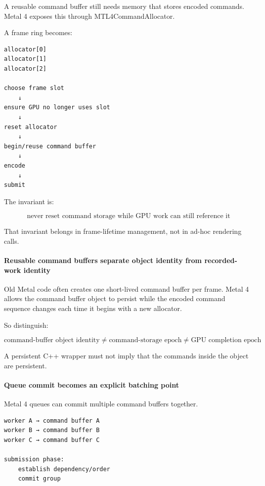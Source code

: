 A reusable command buffer still needs memory that stores encoded commands. Metal 4 exposes this through MTL4CommandAllocator.

A frame ring becomes:

\begin{verbatim}
allocator[0]
allocator[1]
allocator[2]

choose frame slot
    ↓
ensure GPU no longer uses slot
    ↓
reset allocator
    ↓
begin/reuse command buffer
    ↓
encode
    ↓
submit
\end{verbatim}

The invariant is:

\[
\boxed{
\text{never reset command storage while GPU work can still reference it}
}
\]

That invariant belongs in frame-lifetime management, not in ad-hoc rendering calls.

\paragraph{Reusable command buffers separate object identity from recorded-work identity}\label{reusable-command-buffers-separate-object-identity-from-recorded-work-identity}

Old Metal code often creates one short-lived command buffer per frame. Metal 4 allows the command buffer object to persist while the encoded command sequence changes each time it begins with a new allocator.

So distinguish:

\[
\boxed{
\text{command-buffer object identity}
\neq
\text{command-storage epoch}
\neq
\text{GPU completion epoch}
}
\]

A persistent C++ wrapper must not imply that the commands inside the object are persistent.

\paragraph{Queue commit becomes an explicit batching point}\label{queue-commit-becomes-an-explicit-batching-point}

Metal 4 queues can commit multiple command buffers together.

\begin{verbatim}
worker A → command buffer A
worker B → command buffer B
worker C → command buffer C

submission phase:
    establish dependency/order
    commit group
\end{verbatim}

